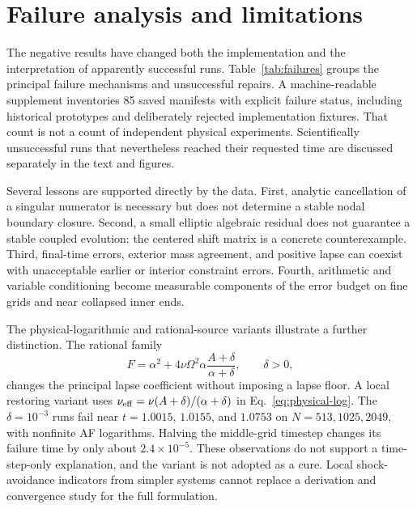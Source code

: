 \section{Failure analysis and limitations}
\label{sec:failures}
The negative results have changed both the implementation and the interpretation of apparently successful runs. Table~\ref{tab:failures} groups the principal failure mechanisms and unsuccessful repairs. A machine-readable supplement inventories 85 saved manifests with explicit failure status, including historical prototypes and deliberately rejected implementation fixtures. That count is not a count of independent physical experiments. Scientifically unsuccessful runs that nevertheless reached their requested time are discussed separately in the text and figures.

Several lessons are supported directly by the data. First, analytic cancellation of a singular numerator is necessary but does not determine a stable nodal boundary closure. Second, a small elliptic algebraic residual does not guarantee a stable coupled evolution: the centered shift matrix is a concrete counterexample. Third, final-time errors, exterior mass agreement, and positive lapse can coexist with unacceptable earlier or interior constraint errors. Fourth, arithmetic and variable conditioning become measurable components of the error budget on fine grids and near collapsed inner ends.

The physical-logarithmic and rational-source variants illustrate a further distinction. The rational family
\begin{equation}
 F=\alpha^2+4\nu\Omega^2\alpha\frac{A+\delta}{\alpha+\delta},
 \qquad\delta>0,
\end{equation}
changes the principal lapse coefficient without imposing a lapse floor. A local restoring variant uses $\nu_{\rm eff}=\nu(A+\delta)/(\alpha+\delta)$ in Eq.~\eqref{eq:physical-log}. The $\delta=10^{-3}$ runs fail near $t=1.0015$, $1.0155$, and $1.0753$ on $N=513,1025,2049$, with nonfinite AF logarithms. Halving the middle-grid timestep changes its failure time by only about $2.4\times10^{-5}$. These observations do not support a time-step-only explanation, and the variant is not adopted as a cure. Local shock-avoidance indicators from simpler systems cannot replace a derivation and convergence study for the full formulation.

